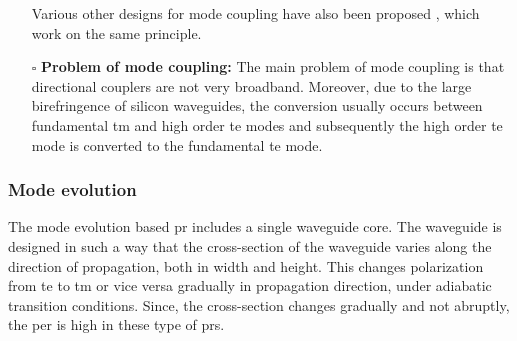 \documentclass[../report.tex]{subfiles}
\begin{document}
\begin{itemize}[leftmargin=*]
	Various other designs for mode coupling have also been proposed \cite{wang_design_2014,ding_Integrated_2013}, which work on the same principle.
	
	\item[$\square$] \textbf{Problem of mode coupling:} The main problem of mode coupling is that directional couplers are not very broadband. Moreover, due to the large birefringence of silicon waveguides, the conversion usually occurs between fundamental \gls{tm} and high order \gls{te} modes and subsequently the high order \gls{te} mode is converted to the fundamental \gls{te} mode.
\end{itemize}		
			\subsubsection{Mode evolution}
The mode evolution based \gls{pr} includes a single waveguide core. The waveguide is designed in such a way that the cross-section of the waveguide varies along the direction of propagation, both in width and height. This changes polarization from \gls{te} to \gls{tm} or vice versa gradually in propagation direction, under adiabatic transition conditions. Since, the cross-section changes gradually and not abruptly, the \gls{per} is high in these type of \gls{pr}s.
\end{document}
